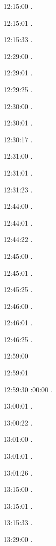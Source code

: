 12:15:00 . 

12:15:01 . 

12:15:33 . 

12:29:00 . 

12:29:01 .

12:29:25 .

12:30:00 .

12:30:01 .

12:30:17 .

12:31:00 .

12:31:01 .

12:31:23 .

12:44:00 .

12:44:01 .

12:44:22 .

12:45:00 .

12:45:01 .

12:45:25 .

12:46:00 .

12:46:01 .

12:46:25 .

12:59:00 

12:59:01 

12:59:30 
:00:00 . 

13:00:01 . 

13:00:22 . 

13:01:00 . 

13:01:01 . 

13:01:26 . 

13:15:00 . 

13:15:01 .

13:15:33 .

13:29:00 . 

